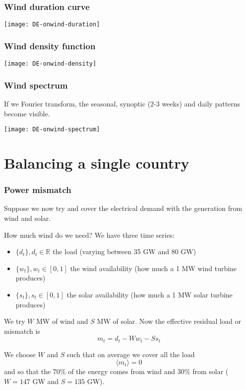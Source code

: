 \documentclass[10pt,aspectratio=169,dvipsnames]{beamer}
\newcommand{\R}{\mathbb{R}}
\let\olditem\item
\renewcommand{\item}{%
\olditem\vspace{5pt}}
\begin{document}
\begin{frame}
  \frametitle{Wind duration curve}



  \centering
  \texttt{[image: DE-onwind-duration]}

\end{frame}




\begin{frame}
  \frametitle{Wind density function}

  \centering
  \texttt{[image: DE-onwind-density]}

\end{frame}




\begin{frame}
  \frametitle{Wind spectrum}

  If we Fourier transform, the \alert{seasonal}, \alert{synoptic} (2-3 weeks) and \alert{daily} patterns become visible.

  \centering
  \texttt{[image: DE-onwind-spectrum]}

\end{frame}


\section{Balancing a single country}



\begin{frame}
  \frametitle{Power mismatch}

  Suppose we now try and cover the electrical demand with the
  generation from wind and solar.

  How much wind do we need? We have three time series:
  \begin{itemize}
  \item $\{ d_t\}, d_t \in \R$ the load (varying between 35 GW and 80 GW)
  \item $\{ w_t\}, w_t \in [0,1]$ the wind availability (how much a 1 MW wind turbine produces)
  \item $\{ s_t\}, s_t \in [0,1]$ the solar availability  (how much a 1 MW solar turbine produces)
  \end{itemize}

  We try $W$ MW of wind and $S$ MW of solar. Now the effective \alert{residual load} or \alert{mismatch} is
  \begin{equation*}
    m_t = d_t - Ww_t - Ss_t
  \end{equation*}

  We choose $W$ and $S$ such that on \alert{average} we cover all the load
  \begin{equation*}
    \langle m_t \rangle = 0
  \end{equation*}
  and so that the 70\% of the energy comes from wind and 30\% from solar ($W = 147$ GW and $S = 135$ GW).

\end{frame}
\end{document}
